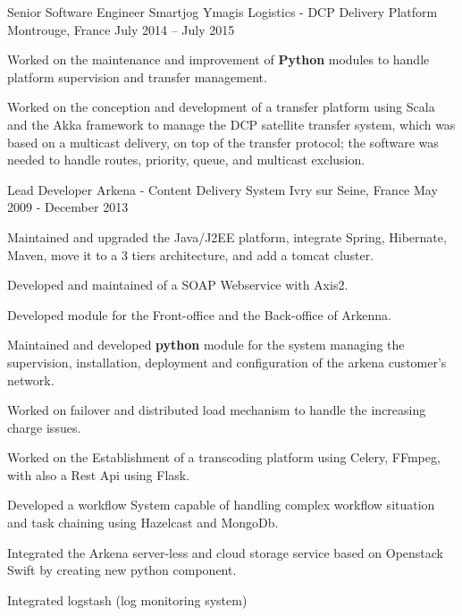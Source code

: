 \begin{cventries}
  \cventry
    {Senior Software Engineer} %
    {Smartjog Ymagis Logistics - DCP Delivery Platform} %
    {Montrouge, France} %
    {July 2014 – July 2015} %
    {
      \begin{cvitems} %
        \item {Worked on the maintenance and improvement of \textbf{Python} modules to handle platform supervision and transfer management.}
        \item {Worked on the conception and development of a transfer platform using Scala and the Akka framework to manage the DCP satellite transfer system, which was based on a multicast delivery, on top of the transfer protocol; the software was needed to handle routes, priority, queue, and multicast exclusion.}
      \end{cvitems}
    }

  \cventry
    {Lead Developer} %
    {Arkena - Content Delivery System} %
    {Ivry sur Seine, France} %
    {May 2009 - December 2013} %
    {
      \begin{cvitems} %
        \item {Maintained and upgraded the Java/J2EE platform, integrate Spring, Hibernate, Maven, move it to a 3 tiers architecture, and add a tomcat cluster.}
        \item {Developed and maintained of a SOAP Webservice with Axis2.}
        \item {Developed module for the Front-office and the Back-office of Arkenna.}
        \item {Maintained and developed \textbf{python} module for the system managing the supervision, installation, deployment and configuration of the arkena customer’s network.}
        \item {Worked on failover and distributed load mechanism to handle the increasing charge issues.}
        \item {Worked on the Establishment of a transcoding platform using Celery, FFmpeg, with also a Rest Api using Flask.}
        \item {Developed a workflow System capable of handling complex workflow situation and task chaining using Hazelcast and MongoDb.}
        \item {Integrated the Arkena server-less and cloud storage service based on Openstack Swift by creating new python component.}
        \item {Integrated logstash (log monitoring system)}
      \end{cvitems}
    }


\end{cventries}
